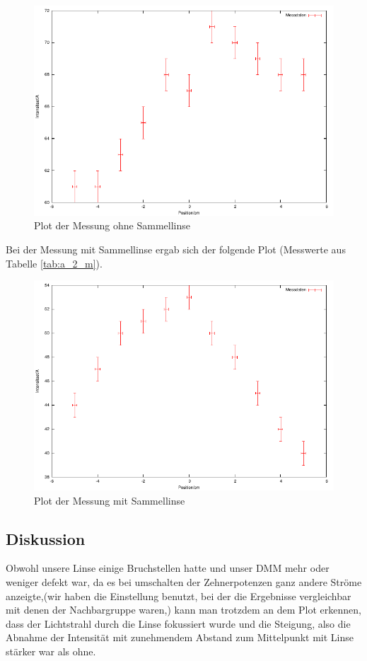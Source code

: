 \documentclass[12pt]{scrartcl}
\begin{document}
\begin{figure}[H]
\centering
    \includegraphics[scale = 1]{a_2_o.pdf}
  	\caption[Plot der Messung ohne Sammellinse]{Plot der Messung ohne Sammellinse}
  \label{fig:a_2_o}
\end{figure}

Bei der Messung mit Sammellinse ergab sich der folgende Plot (Messwerte aus Tabelle \ref{tab:a_2_m}).


\begin{figure}[H]
\centering
    \includegraphics[scale = 1]{a_2_m.pdf}
  	\caption[Plot der Messung mit Sammellinse]{Plot der Messung mit Sammellinse}
  \label{fig:a_2_m}
\end{figure}
\subsection{Diskussion}
Obwohl unsere Linse einige Bruchstellen hatte und unser DMM mehr oder weniger defekt war, da es bei umschalten der Zehnerpotenzen ganz andere Ströme anzeigte,(wir haben die Einstellung benutzt, bei der die Ergebnisse vergleichbar mit denen der Nachbargruppe waren,) kann man trotzdem an dem Plot erkennen, dass der Lichtstrahl durch die Linse fokussiert wurde und die Steigung, also die Abnahme der Intensität mit zunehmendem Abstand zum Mittelpunkt mit Linse stärker war als ohne.
\end{document}
